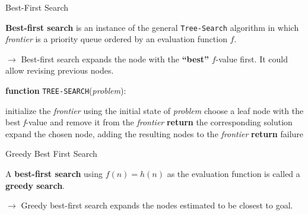 \documentclass[9pt]{beamer}
\begin{document}
\begin{frame}{Best-First Search}
\begin{small}

\textbf{Best-first search} is an instance of the general \texttt{Tree-Search} algorithm in which \emph{frontier} is a priority queue ordered by an evaluation function $f$.

$\rightarrow$ Best-first search expands the node with the \textbf{“best”} $f$-value first. It could allow revising previous nodes.

\textbf{function} \texttt{TREE-SEARCH}(\emph{problem}):\\

\begin{minipage}{0.20\linewidth}\vspace{0pt}%
\end{minipage}
\hskip10pt
\begin{minipage}{0.80\linewidth}\vspace{0pt}%
\begin{algorithm}[H]
	initialize the \emph{frontier} using the initial state of \emph{problem}\;
 	{
  		choose a leaf node with the best \emph{f}-value and remove it from the \emph{frontier}\;
  		{
  		    \textbf{return} the corresponding solution\;
  		}
  		expand the chosen node, adding the resulting nodes to the \emph{frontier}\;
  	}
  	\textbf{return} failure\;
\end{algorithm}
\end{minipage}

\end{small}
\end{frame}

\begin{frame}{Greedy Best First Search}
\begin{small}

A \textbf{best-first search} using $f(n) = h(n)$ as the evaluation function is called a \textbf{greedy search}.

$\rightarrow$ Greedy best-first search expands the nodes estimated to be closest to goal.

\end{small}
\end{frame}
\end{document}

